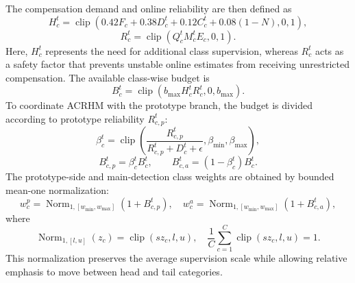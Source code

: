 \documentclass[letterpaper,journal]{IEEEtran}
\begin{document}
The compensation demand and online reliability are then defined as
\begin{equation}
H_c^t=\operatorname{clip}\left(
0.42F_c+0.38D_c^t+0.12C_c^t+0.08(1-N),0,1
\right),
\end{equation}
\begin{equation}
R_c^t=\operatorname{clip}\left(Q_c^tM_c^tE_c,0,1\right).
\end{equation}
Here, $H_c^t$ represents the need for additional class supervision, whereas $R_c^t$ acts as a safety factor that prevents unstable online estimates from receiving unrestricted compensation. The available class-wise budget is
\begin{equation}
B_c^t=\operatorname{clip}\left(b_{\max}H_c^tR_c^t,0,b_{\max}\right).
\end{equation}
To coordinate ACRHM with the prototype branch, the budget is divided according to prototype reliability $R_{c,p}^t$:
\begin{equation}
\beta_c^t=\operatorname{clip}\left(
\frac{R_{c,p}^t}{R_{c,p}^t+D_c^t+\epsilon},
\beta_{\min},\beta_{\max}\right),
\end{equation}
\begin{equation}
B_{c,p}^t=\beta_c^tB_c^t,\qquad
B_{c,a}^t=(1-\beta_c^t)B_c^t.
\end{equation}
The prototype-side and main-detection class weights are obtained by bounded mean-one normalization:
\begin{equation}
w_{c}^{p}=\operatorname{Norm}_{1,[w_{\min},w_{\max}]}(1+B_{c,p}^t),\quad
w_{c}^{a}=\operatorname{Norm}_{1,[w_{\min},w_{\max}]}(1+B_{c,a}^t),
\end{equation}
where
\begin{equation}
\operatorname{Norm}_{1,[l,u]}(z_c)
=\operatorname{clip}(s z_c,l,u),\quad
\frac{1}{C}\sum_{c=1}^{C}\operatorname{clip}(s z_c,l,u)=1.
\end{equation}
This normalization preserves the average supervision scale while allowing relative emphasis to move between head and tail categories.
\end{document}
